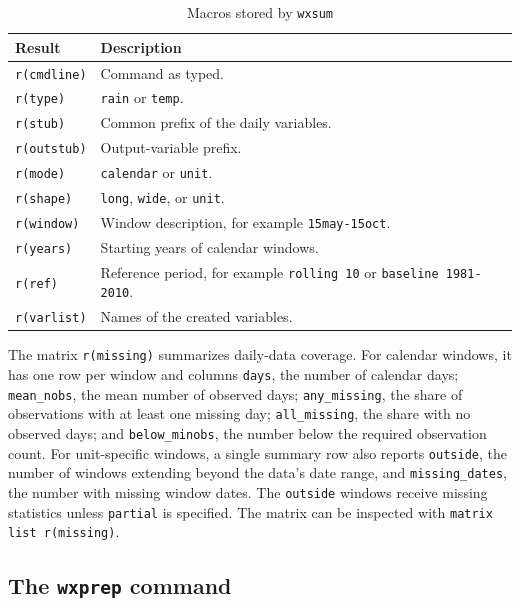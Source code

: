\begin{table}[htbp]
	\caption{Macros stored by \texttt{wxsum}}
	\label{tab:wxsummacros}
	\begin{center}
		\begin{tabularx}{\textwidth}{l>{\raggedright\arraybackslash}X}
			\hline
			Result & Description \\
			\hline
			\texttt{r(cmdline)} & Command as typed. \\
			\texttt{r(type)} & \texttt{rain} or \texttt{temp}. \\
			\texttt{r(stub)} & Common prefix of the daily variables. \\
			\texttt{r(outstub)} & Output-variable prefix. \\
			\texttt{r(mode)} & \texttt{calendar} or \texttt{unit}. \\
			\texttt{r(shape)} & \texttt{long}, \texttt{wide}, or \texttt{unit}. \\
			\texttt{r(window)} & Window description, for example \texttt{15may-15oct}. \\
			\texttt{r(years)} & Starting years of calendar windows. \\
			\texttt{r(ref)} & Reference period, for example \texttt{rolling 10} or \texttt{baseline 1981-2010}. \\
			\texttt{r(varlist)} & Names of the created variables. \\
			\hline
		\end{tabularx}
	\end{center}
\end{table}

The matrix \texttt{r(missing)} summarizes daily-data coverage. For calendar windows, it has one row per window and columns \texttt{days}, the number of calendar days; \texttt{mean\_nobs}, the mean number of observed days; \texttt{any\_missing}, the share of observations with at least one missing day; \texttt{all\_missing}, the share with no observed days; and \texttt{below\_minobs}, the number below the required observation count. For unit-specific windows, a single summary row also reports \texttt{outside}, the number of windows extending beyond the data's date range, and \texttt{missing\_dates}, the number with missing window dates. The \texttt{outside} windows receive missing statistics unless \texttt{partial} is specified. The matrix can be inspected with \texttt{matrix list r(missing)}.

\subsection{The \texttt{wxprep} command}
\label{sec:wxprep}

